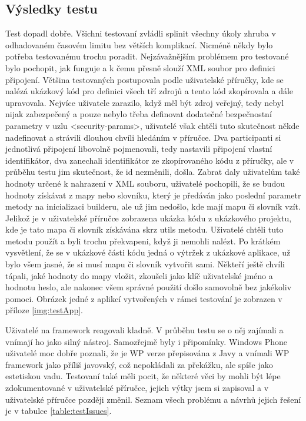\subsection{Výsledky testu}
Test dopadl dobře. Všichni testovaní zvládli splinit všechny úkoly zhruba v odhadovaném časovém limitu bez větších komplikací. Nicméně někdy bylo potřeba testovanému trochu poradit. Nejzávažnějším problémem pro testované bylo pochopit, jak funguje a k čemu přesně slouží XML soubor pro definici připojení. Většina testovaných postupovala podle uživatelské příručky, kde se nalézá ukázkový kód pro definici všech tří zdrojů a tento kód zkopírovala a dále upravovala. Nejvíce uživatele zarazilo, když měl být zdroj veřejný, tedy nebyl nijak zabezpečený a pouze nebylo třeba definovat dodatečné bezpečnostní parametry v uzlu <security-params>, uživatelé však chtěli tuto skutečnost někde nadefinovat a strávili dlouhou chvíli hledáním v příručce. Dva participanti si jednotlivá připojení libovolně pojmenovali, tedy nastavili připojení vlastní identifikátor, dva zanechali identifikátor ze zkopírovaného kódu z příručky, ale v průběhu testu jim skutečnost, že id nezměnili, došla. Zabrat daly uživatelům také hodnoty určené k nahrazení v XML souboru, uživatelé pochopili, že se budou hodnoty získávat z mapy nebo slovníku, který je předáván jako poslední parametr metody na inicializaci builderu, ale už jim nedošlo, kde mají mapu či slovník vzít. Jelikož je v uživatelské příručce zobrazena ukázka kódu z ukázkového projektu, kde je tato mapa či slovník získávána skrz utils metodu. Uživatelé chtěli tuto metodu použít a byli trochu překvapeni, když ji nemohli nalézt. Po krátkém vysvětlení, že se v ukázkové části kódu jedná o výtržek z ukázkové aplikace, už bylo všem jasné, že si musí mapu či slovník vytvořit sami. Někteří ještě chvíli tápali, jaké hodnoty do mapy vložit, zkoušeli jako klíč uživatelské jméno a hodnotu heslo, ale nakonec všem správné použití došlo samovolně bez jakékoliv pomoci. Obrázek jedné z aplikcí vytvořených v rámci testování je zobrazen v příloze \ref{img:testApp}.

Uživatelé na framework reagovali kladně. V průběhu testu se o něj zajímali a vnímají ho jako silný nástroj. Samozřejmě byly i připomínky. Windows Phone uživatelé moc dobře poznali, že je WP verze přepisována z Javy a vnímali WP framework jako příliš javovský, což nepokládali za překážku, ale spíše jako estetiskou vadu. Testovaní také měli pocit, že některé věci by mohli být lépe zdokumentované v uživatelské příručce, jejich výtky jsem si zapisoval a v uživatelské příručce později změnil. Seznam všech problému a návrhů jejich řešení je v tabulce \ref{table:testIssues}.

